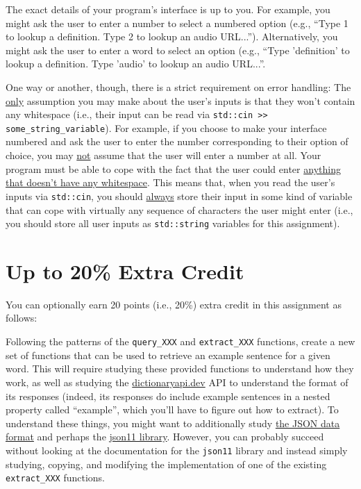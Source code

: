 \documentclass{article}
\begin{document}
The exact details of your program's interface is up to you. For example, you might ask the user to enter a number to select a numbered option (e.g., ``Type 1 to lookup a definition. Type 2 to lookup an audio URL...''). Alternatively, you might ask the user to enter a word to select an option (e.g., ``Type 'definition' to lookup a definition. Type 'audio' to lookup an audio URL...''.

One way or another, though, there is a strict requirement on error handling: The \ul{only} assumption you may make about the user's inputs is that they won't contain any whitespace (i.e., their input can be read via \texttt{std::cin >> some\_string\_variable}). For example, if you choose to make your interface numbered and ask the user to enter the number corresponding to their option of choice, you may \ul{not} assume that the user will enter a number at all. Your program must be able to cope with the fact that the user could enter \ul{anything that doesn't have any whitespace}. This means that, when you read the user's inputs via \texttt{std::cin}, you should \ul{always} store their input in some kind of variable that can cope with virtually any sequence of characters the user might enter (i.e., you should store all user inputs as \texttt{std::string} variables for this assignment).

\section{Up to 20\% Extra Credit}

You can optionally earn 20 points (i.e., 20\%) extra credit in this assignment as follows:

Following the patterns of the \texttt{query\_XXX} and \texttt{extract\_XXX} functions, create a new set of functions that can be used to retrieve an example sentence for a given word. This will require studying these provided functions to understand how they work, as well as studying the \href{https://dictionaryapi.dev/}{dictionaryapi.dev} API to understand the format of its responses (indeed, its responses do include example sentences in a nested property called ``example'', which you'll have to figure out how to extract). To understand these things, you might want to additionally study \href{https://developer.mozilla.org/en-US/docs/Learn/JavaScript/Objects/JSON}{the JSON data format} and perhaps the \href{https://github.com/dropbox/json11}{json11 library}. However, you can probably succeed without looking at the documentation for the \texttt{json11} library and instead simply studying, copying, and modifying the implementation of one of the existing \texttt{extract\_XXX} functions.
\end{document}
